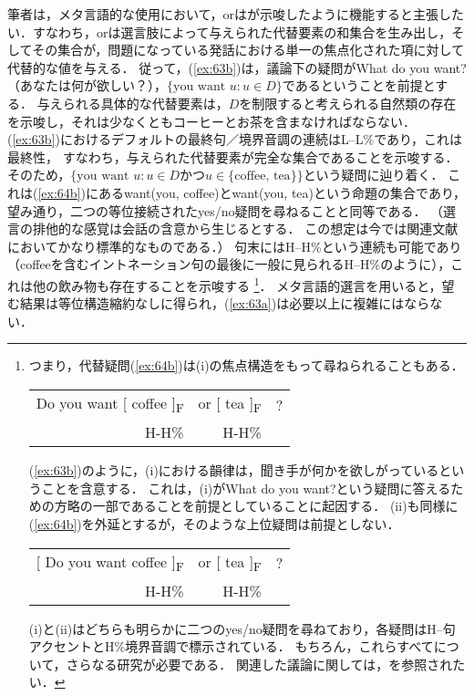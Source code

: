 \documentclass{goken}
\begin{document}
筆者は，メタ言語的な使用において，orは\citeauthor{vonStechow1991}が示唆したように機能すると主張したい．すなわち，orは選言肢によって与えられた代替要素の和集合を生み出し，そしてその集合が，問題になっている発話における単一の焦点化された項に対して代替的な値を与える．
従って，(\ref{ex:63b})は，議論下の疑問がWhat do you want?（あなたは何が欲しい？），$\{\text{you want }u: u \in D\}$であるということを前提とする．
与えられる具体的な代替要素は，$D$を制限すると考えられる自然類の存在を示唆し，それは少なくともコーヒーとお茶を含まなければならない．
(\ref{ex:63b})におけるデフォルトの最終句／境界音調の連続はL--L\%であり，これは最終性，
すなわち，与えられた代替要素が完全な集合であることを示唆する．
そのため，$\{\text{you want }u: u \in D \text{かつ} u \in \{\text{coffee, tea}\}\}$という疑問に辿り着く．
これは(\ref{ex:64b})にあるwant(you, coffee)とwant(you, tea)という命題の集合であり，望み通り，二つの等位接続されたyes/no疑問を尋ねることと同等である．
（選言の排他的な感覚は会話の含意から生じるとする．
この想定は今では関連文献においてかなり標準的なものである．）
句末にはH--H\%という連続も可能であり（coffeeを含むイントネーション句の最後に一般に見られるH--H\%のように），これは他の飲み物も存在することを示唆する
\footnote{%
	つまり，代替疑問(\ref{ex:64b})は(i)の焦点構造をもって尋ねられることもある．%

  \begin{exe}
	  \label{ex:fn33:1}
    \begin{tabular}[t]{r@{ }r@{ }l}{}Do you want [ coffee ]\textsubscript{F} & or [ tea ]\textsubscript{F} & ?\\
    \scriptsize{H-H\%} & \scriptsize{H-H\%} & \end{tabular}
  \end{exe}

  \noindent
  (\ref{ex:63b})のように，(i)における韻律は，聞き手が何かを欲しがっているということを含意する．
  これは，(i)がWhat do you want?という疑問に答えるための方略の一部であることを前提としていることに起因する．
  (ii)も同様に(\ref{ex:64b})を外延とするが，そのような上位疑問は前提としない．

  \begin{exe}
  	\label{ex:fn33:2}
    \begin{tabular}[t]{r@{ }r@{ }l}{}[ Do you want coffee ]\textsubscript{F} & or [ tea ]\textsubscript{F} & ?\\
    \scriptsize{H-H\%} & \scriptsize{H-H\%} & \end{tabular}
  \end{exe}

  \noindent
  (i)と(ii)はどちらも明らかに二つのyes/no疑問を尋ねており，各疑問はH--句アクセントとH\%境界音調で標示されている．
  もちろん，これらすべてについて，さらなる研究が必要である．
  関連した議論に関しては，\citealt[302ff]{PierrehumbertHirschberg1990}を参照されたい．
}．
メタ言語的選言を用いると，望む結果は等位構造縮約なしに得られ，(\ref{ex:63a})は必要以上に複雑にはならない．
\end{document}
